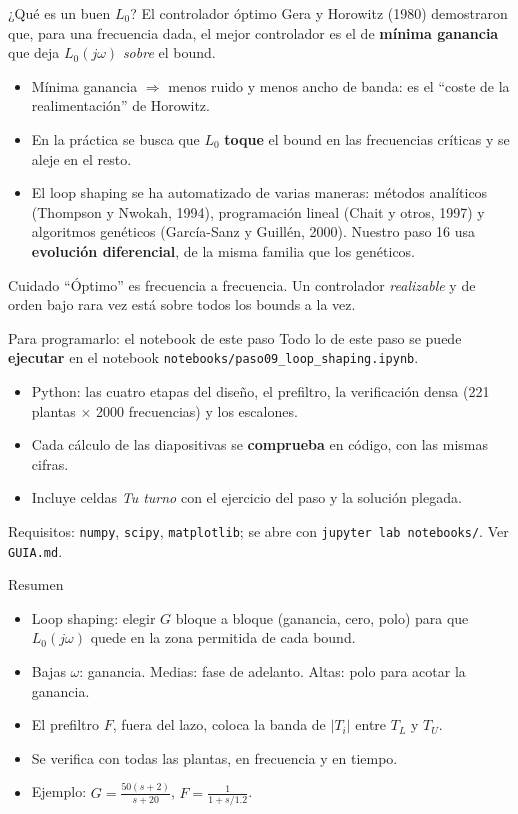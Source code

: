 \documentclass[aspectratio=169,11pt]{beamer}
\begin{document}
\begin{frame}{¿Qué es un buen $L_0$? El controlador óptimo}
  \small
  Gera y Horowitz (1980) demostraron que, para una frecuencia dada, el mejor controlador es el de \textbf{mínima ganancia} que deja $L_0(j\omega)$ \emph{sobre} el bound.
  \begin{itemize}
    \item Mínima ganancia $\Rightarrow$ menos ruido y menos ancho de banda: es el ``coste de la realimentación'' de Horowitz.
    \item En la práctica se busca que $L_0$ \textbf{toque} el bound en las frecuencias críticas y se aleje en el resto.
    \item El loop shaping se ha automatizado de varias maneras: métodos analíticos (Thompson y Nwokah, 1994), programación lineal (Chait y otros, 1997) y algoritmos genéticos (García-Sanz y Guillén, 2000). Nuestro paso 16 usa \textbf{evolución diferencial}, de la misma familia que los genéticos.
  \end{itemize}
  \begin{alertblock}{Cuidado}
    ``Óptimo'' es frecuencia a frecuencia. Un controlador \emph{realizable} y de orden bajo rara vez está sobre todos los bounds a la vez.
  \end{alertblock}
\end{frame}

\begin{frame}{Para programarlo: el notebook de este paso}
  \small
  Todo lo de este paso se puede \textbf{ejecutar} en el notebook \texttt{notebooks/paso09\_loop\_shaping.ipynb}.
  \begin{itemize}
    \item Python: las cuatro etapas del diseño, el prefiltro, la verificación densa (221 plantas $\times$ 2000 frecuencias) y los escalones.
    \item Cada cálculo de las diapositivas se \textbf{comprueba} en código, con las mismas cifras.
    \item Incluye celdas \emph{Tu turno} con el ejercicio del paso y la solución plegada.
  \end{itemize}
  \footnotesize Requisitos: \texttt{numpy}, \texttt{scipy}, \texttt{matplotlib}; se abre con \texttt{jupyter lab notebooks/}. Ver \texttt{GUIA.md}.
\end{frame}

\begin{frame}{Resumen}
  \small
  \begin{itemize}
    \item Loop shaping: elegir $G$ bloque a bloque (ganancia, cero, polo) para que $L_0(j\omega)$ quede en la zona permitida de cada bound.
    \item Bajas $\omega$: ganancia. Medias: fase de adelanto. Altas: polo para acotar la ganancia.
    \item El prefiltro $F$, fuera del lazo, coloca la banda de $|T_i|$ entre $T_L$ y $T_U$.
    \item Se verifica con todas las plantas, en frecuencia y en tiempo.
    \item Ejemplo: $G=\frac{50(s+2)}{s+20}$, $F=\frac{1}{1+s/1.2}$.
  \end{itemize}
\end{frame}
\end{document}
